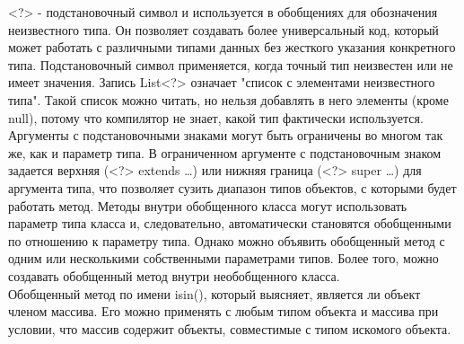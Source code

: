 <?> - подстановочный символ и используется в обобщениях для обозначения неизвестного типа. Он позволяет создавать более универсальный код, который может работать с различными типами данных без жесткого указания конкретного типа. Подстановочный символ применяется, когда точный тип неизвестен или не имеет значения. Запись List<?> означает "список с элементами неизвестного типа". Такой список можно читать, но нельзя добавлять в него элементы (кроме null), потому что компилятор не знает, какой тип фактически используется. Аргументы с подстановочными знаками могут быть ограничены во многом так же, как и параметр типа. В ограниченном аргументе с подстановочным знаком задается верхняя (<?> extends \dots) или нижняя граница (<?> super \dots) для аргумента типа, что позволяет сузить диапазон типов объектов, с которыми будет работать метод. Методы внутри обобщенного класса могут использовать параметр типа класса и, следовательно, автоматически становятся обобщенными по отношению к параметру типа. Однако можно объявить обобщенный метод с одним или несколькими собственными параметрами типов. Более того, можно создавать обобщенный метод внутри необобщенного класса. \\
Обобщенный метод по имени isin(), который выясняет, является ли объект членом массива. Его можно применять с любым типом объекта и массива при условии, что массив содержит объекты, совместимые с типом искомого объекта. \\
